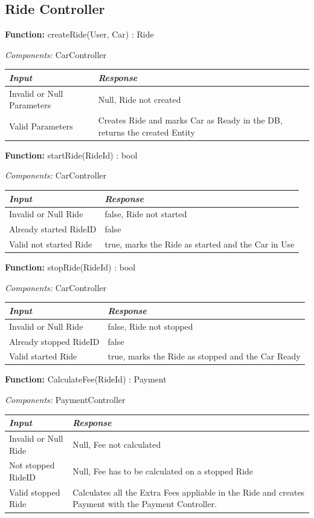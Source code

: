 \documentclass[a4paper]{article}
\begin{document}
\subsection{Ride Controller}
\textbf{Function:} createRide(User, Car) : Ride \par
\textit{Components:} CarController
\begin{center}
\begin{tabular}{ | L{6cm} | L{6cm} | }
\hline
	\textit{Input}& \textit{Response}\\ \hline
	Invalid or Null Parameters & Null, Ride not created \\ \hline
	Valid Parameters & Creates Ride and marks Car as Ready in the DB, returns the created Entity\\ \hline
\end{tabular}
\end{center}
\textbf{Function:} startRide(RideId) : bool \par
\textit{Components:} CarController
\begin{center}
\begin{tabular}{ | L{6cm} | L{6cm} | }
\hline
	\textit{Input}& \textit{Response}\\ \hline
	Invalid or Null Ride & false, Ride not started \\ \hline
	Already started RideID & false \\ \hline
	Valid not started Ride & true, marks the Ride as started and the Car in Use\\ \hline
\end{tabular}
\end{center}
\textbf{Function:} stopRide(RideId) : bool \par
\textit{Components:} CarController
\begin{center}
\begin{tabular}{ | L{6cm} | L{6cm} | }
\hline
	\textit{Input}& \textit{Response}\\ \hline
	Invalid or Null Ride & false, Ride not stopped \\ \hline
	Already stopped RideID & false \\ \hline
	Valid started Ride & true, marks the Ride as stopped and the Car Ready\\ \hline
\end{tabular}
\end{center}
\textbf{Function:} CalculateFee(RideId) : Payment \par
\textit{Components:} PaymentController
\begin{center}
\begin{tabular}{ | L{6cm} | L{6cm} | }
\hline
	\textit{Input}& \textit{Response}\\ \hline
	Invalid or Null Ride & Null, Fee not calculated\\ \hline
	Not stopped RideID & Null, Fee has to be calculated on a stopped Ride \\ \hline
	Valid stopped Ride & Calculates all the Extra Fees appliable in the Ride and creates Payment with the Payment Controller.\\ \hline
\end{tabular}
\end{center}
\end{document}
